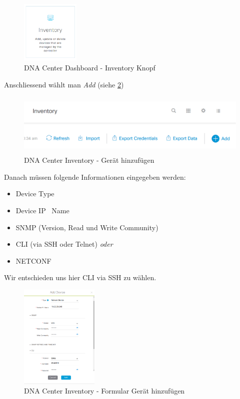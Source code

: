 \begin{figure}[H]
	\centering
	\includegraphics[height=3cm]{img/dna-center-inventory-button.PNG}
	\caption{DNA Center Dashboard - Inventory Knopf}
	\label{fig:dna-center-inventory-button}
\end{figure}

Anschliessend wählt man \textit{Add} (siehe \ref{fig:dna-center-inventory-add})

\begin{figure}[H]
	\centering
	\includegraphics[height=3cm]{img/dna-center-inventory-add.PNG}
	\caption{DNA Center Inventory - Gerät hinzufügen}
	\label{fig:dna-center-inventory-add}
\end{figure}

Danach müssen folgende Informationen eingegeben werden:

\begin{itemize}
	\item Device Type
	\item Device IP \ Name
	\item SNMP (Version, Read und Write Community)
	\item CLI (via SSH oder Telnet) \textit{oder}
	\item NETCONF
\end{itemize}

Wir entschieden uns hier CLI via SSH zu wählen.

\begin{figure}[H]
	\centering
	\includegraphics[height=5cm]{img/dna-center-inventory-add-form.png}
	\caption{DNA Center Inventory - Formular Gerät hinzufügen}
	\label{fig:dna-center-inventory-add-form}
\end{figure}

